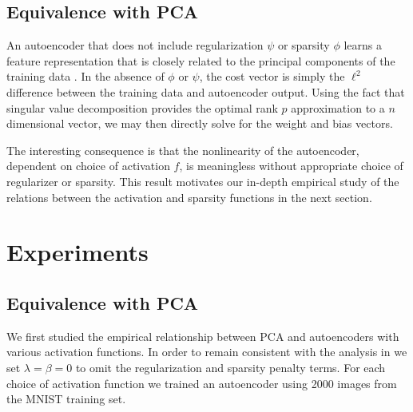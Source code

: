 \documentclass[twocolumn]{article}
\begin{document}
\subsection{Equivalence with PCA}
An autoencoder that does not include regularization $\psi$ or sparsity $\phi$
learns a feature representation that is closely related to the principal
components of the training data \cite{bourlard1988auto}. In the absence of
$\phi$ or $\psi$, the cost vector is simply the $\ell^2$ difference between the
training data and autoencoder output. Using the fact that singular value
decomposition provides the optimal rank $p$ approximation to a $n$ dimensional
vector, we may then directly solve for the weight and bias vectors.

The interesting consequence is that the nonlinearity of the autoencoder,
dependent on choice of activation $f$, is meaningless without appropriate choice
of regularizer or sparsity. This result motivates our in-depth empirical study
of the relations between the activation and sparsity functions in the next
section.


\section{Experiments}
\subsection{Equivalence with PCA}
We first studied the empirical relationship between PCA and autoencoders with
various activation functions. In order to remain consistent with the analysis
in \cite{bourlard1988auto} we set $\lambda=\beta=0$ to omit the regularization
and sparsity penalty terms. For each choice of activation function we trained
an autoencoder using 2000 images from the MNIST \cite{lecun1998mnist} training
set.
\end{document}

